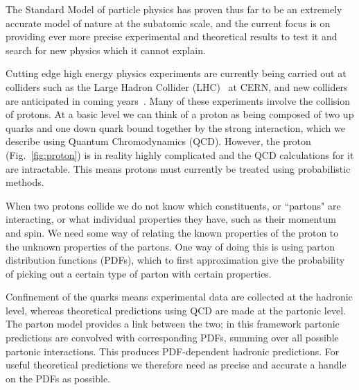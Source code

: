 \documentclass[a4paper,12pt,oneside,openright]{book}
\numberwithin{equation}{section}
\numberwithin{figure}{section}
\numberwithin{table}{section}
\begin{document}
The Standard Model of particle physics has proven thus
far to be an extremely accurate  model of nature at the subatomic scale, and the current focus is on providing ever more precise
experimental and theoretical results to test it and search for new physics which it cannot explain.

Cutting edge high energy physics experiments are currently being carried out at colliders such as the Large Hadron Collider
(LHC)~\cite{LHC} at CERN, and new colliders are anticipated in coming years~\cite{FCC, ILC, CLIC}. Many of these experiments involve the collision of protons. At a basic level we can think of
a proton as being composed of two up quarks and one down quark bound together by the strong
interaction, which we describe using Quantum Chromodynamics (QCD). However, the proton (Fig.~\ref{fig:proton}) is in reality
highly complicated and the QCD calculations for it are intractable. This means protons must currently be treated using probabilistic methods. 

When two protons collide we do not know which constituents,
or ``partons" are interacting, or what individual properties they have, such as their momentum and spin. We need
some way of relating the known properties of the proton to the unknown properties of the partons.
One way of doing this is using parton distribution functions (PDFs), which to first approximation give the
probability of picking out a certain type of parton with certain properties.

Confinement of the quarks means experimental data are collected at the hadronic level, whereas theoretical predictions using QCD are made at the partonic level. The parton model provides a
link between the two; in this framework partonic predictions
are convolved with corresponding PDFs, summing over all possible partonic interactions. This produces PDF-dependent
hadronic predictions. For useful theoretical predictions we therefore need as precise and accurate a handle on the PDFs as possible. 
\end{document}
